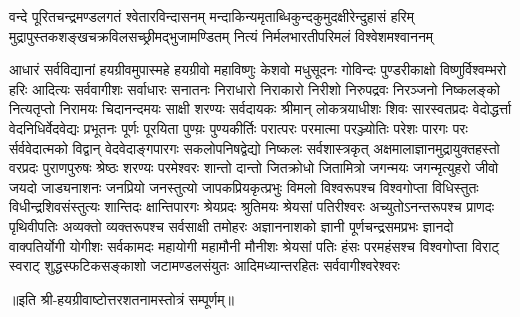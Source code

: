 
\fourlineindentedshloka
{वन्दे पूरितचन्द्रमण्डलगतं श्वेतारविन्दासनम्}
{मन्दाकिन्यमृताब्धिकुन्दकुमुदक्षीरेन्दुहासं हरिम्}
{मुद्रापुस्तकशङ्खचक्रविलसच्छ्रीमद्भुजामण्डितम्}
{नित्यं निर्मलभारतीपरिमलं विश्वेशमश्वाननम्}

{आधारं सर्वविद्यानां हयग्रीवमुपास्महे}
\twolineshloka
{हयग्रीवो महाविष्णुः केशवो मधुसूदनः}
{गोविन्दः पुण्डरीकाक्षो विष्णुर्विश्वम्भरो हरिः}
\twolineshloka
{आदित्यः सर्ववागीशः सर्वाधारः सनातनः}
{निराधारो निराकारो निरीशो निरुपद्रवः}
\twolineshloka
{निरञ्जनो  निष्कलङ्को नित्यतृप्तो निरामयः}
{चिदानन्दमयः साक्षी शरण्यः सर्वदायकः}
\twolineshloka
{श्रीमान् लोकत्रयाधीशः शिवः सारस्वतप्रदः}
{वेदोद्धर्त्ता वेदनिधिर्वेदवेद्यः प्रभूतनः}
\twolineshloka
{पूर्णः पूरयिता पुण्य़ः पुण्यकीर्तिः परात्परः}
{परमात्मा परञ्ज्योतिः परेशः पारगः परः}
\twolineshloka
{र्सर्ववेदात्मको विद्वान् वेदवेदाङ्गपारगः}
{सकलोपनिषद्वेद्यो निष्कलः सर्वशास्त्रकृत्}
\twolineshloka
{अक्षमालाज्ञानमुद्रायुक्तहस्तो वरप्रदः}
{पुराणपुरुषः श्रेष्ठः शरण्यः परमेश्वरः}
\twolineshloka
{शान्तो दान्तो जितक्रोधो जितामित्रो जगन्मयः}
{जगन्मृत्युहरो जीवो जयदो जाड्यनाशनः}
\twolineshloka
{जनप्रियो जनस्तुत्यो जापकप्रियकृत्प्रभुः}
{विमलो विश्वरूपश्च विश्वगोप्ता विधिस्तुतः}
\twolineshloka
{विधीन्द्रशिवसंस्तुत्यः शान्तिदः क्षान्तिपारगः}
{श्रेयप्रदः श्रुतिमयः श्रेयसां पतिरीश्वरः}
\twolineshloka
{अच्युतोऽनन्तरूपश्च प्राणदः पृथिवीपतिः}
{अव्यक्तो व्यक्तरूपश्च सर्वसाक्षी तमोहरः}
\twolineshloka
{अज्ञाननाशको ज्ञानी पूर्णचन्द्रसमप्रभः}
{ज्ञानदो वाक्पतिर्योगी योगीशः सर्वकामदः}
\twolineshloka
{महायोगी महामौनी मौनीशः श्रेयसां पतिः}
{हंसः परमहंसश्च विश्वगोप्ता विराट् स्वराट्}
\twolineshloka
{शुद्धस्फटिकसङ्काशो जटामण्डलसंयुतः}
{आदिमध्यान्तरहितः सर्ववागीश्वरेश्वरः}

॥इति श्री-हयग्रीवाष्टोत्तरशतनामस्तोत्रं सम्पूर्णम्॥
